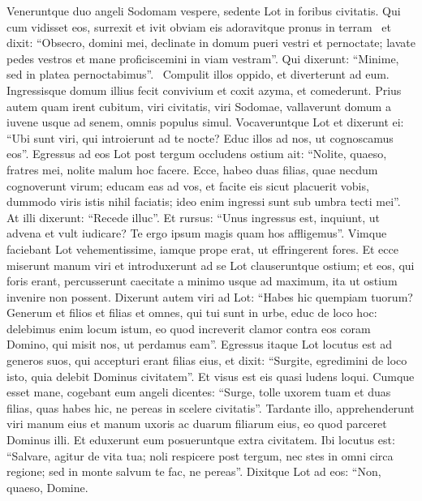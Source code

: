 \begin{biblechapter}
\begin{biblechapter}
\begin{biblechapter}
\begin{biblechapter}
\begin{biblechapter}
\begin{biblechapter}
\begin{biblechapter}
\begin{biblechapter}
\begin{biblechapter}
\begin{biblechapter}
\begin{biblechapter}
\begin{biblechapter}
\begin{biblechapter}
\begin{biblechapter}
\begin{biblechapter}
\begin{biblechapter}
\begin{biblechapter}
\begin{biblechapter}
\begin{biblechapter}
\verse Veneruntque duo angeli Sodomam vespere, sedente Lot in foribus civitatis. Qui cum vidisset eos, surrexit et ivit obviam eis adoravitque pronus in terram 
 \verse et dixit: “Obsecro, domini mei, declinate in domum pueri vestri et pernoctate; lavate pedes vestros et mane proficiscemini in viam vestram”. Qui dixerunt: “Minime, sed in platea pernoctabimus”. 
 \verse Compulit illos oppido, et diverterunt ad eum. Ingressisque domum illius fecit convivium et coxit azyma, et comederunt.
 \verse Prius autem quam irent cubitum, viri civitatis, viri Sodomae, vallaverunt domum a iuvene usque ad senem, omnis populus simul. 
\verse Vocaveruntque Lot et dixerunt ei: “Ubi sunt viri, qui introierunt ad te nocte? Educ illos ad nos, ut cognoscamus eos”. 
\verse Egressus ad eos Lot post tergum occludens ostium ait: 
\verse “Nolite, quaeso, fratres mei, nolite malum hoc facere. 
\verse Ecce, habeo duas filias, quae necdum cognoverunt virum; educam eas ad vos, et facite eis sicut placuerit vobis, dummodo viris istis nihil faciatis; ideo enim ingressi sunt sub umbra tecti mei”. 
\verse At illi dixerunt: “Recede illuc”. Et rursus: “Unus ingressus est, inquiunt, ut advena et vult iudicare? Te ergo ipsum magis quam hos affligemus”. Vimque faciebant Lot vehementissime, iamque prope erat, ut effringerent fores. 
\verse Et ecce miserunt manum viri et introduxerunt ad se Lot clauseruntque ostium; 
\verse et eos, qui foris erant, percusserunt caecitate a minimo usque ad maximum, ita ut ostium invenire non possent.
 \verse Dixerunt autem viri ad Lot: “Habes hic quempiam tuorum? Generum et filios et filias et omnes, qui tui sunt in urbe, educ de loco hoc: 
\verse delebimus enim locum istum, eo quod increverit clamor contra eos coram Domino, qui misit nos, ut perdamus eam”. 
\verse Egressus itaque Lot locutus est ad generos suos, qui accepturi erant filias eius, et dixit: “Surgite, egredimini de loco isto, quia delebit Dominus civitatem”. Et visus est eis quasi ludens loqui.
 \verse Cumque esset mane, cogebant eum angeli dicentes: “Surge, tolle uxorem tuam et duas filias, quas habes hic, ne pereas in scelere civitatis”. 
\verse Tardante illo, apprehenderunt viri manum eius et manum uxoris ac duarum filiarum eius, eo quod parceret Dominus illi. 
\verse Et eduxerunt eum posueruntque extra civitatem. Ibi locutus est: “Salvare, agitur de vita tua; noli respicere post tergum, nec stes in omni circa regione; sed in monte salvum te fac, ne pereas”. 
 \verse Dixitque Lot ad eos: “Non, quaeso, Domine. 

\end{biblechapter}
\end{biblechapter}
\end{biblechapter}
\end{biblechapter}
\end{biblechapter}
\end{biblechapter}
\end{biblechapter}
\end{biblechapter}
\end{biblechapter}
\end{biblechapter}
\end{biblechapter}
\end{biblechapter}
\end{biblechapter}
\end{biblechapter}
\end{biblechapter}
\end{biblechapter}
\end{biblechapter}
\end{biblechapter}
\end{biblechapter}
